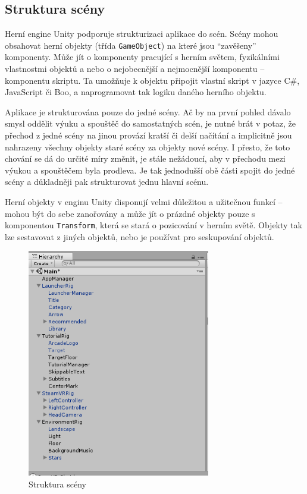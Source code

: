 \subsection{Struktura scény}\label{struktura-scuxe9ny}

Herní engine Unity podporuje strukturizaci aplikace do scén. Scény mohou
obsahovat herní objekty (třída \texttt{GameObject}) na které jsou
``zavěšeny'' komponenty. \autocite{unityscenes} Může jít o komponenty pracující s herním
světem, fyzikálními vlastnostmi objektů a nebo o nejobecnější a
nejmocnější komponentu -- komponentu skriptu. Ta umožňuje k objektu
připojit vlastní skript v jazyce C\#, JavaScript či Boo, a naprogramovat
tak logiku daného herního objektu.

Aplikace je strukturována pouze do jedné scény. Ač by na první pohled
dávalo smysl oddělit výuku a spouštěč do samostatných scén, je nutné
brát v potaz, že přechod z jedné scény na jinou provází kratší či delší
načítání a implicitně jsou nahrazeny všechny objekty staré scény za
objekty nové scény. I přesto, že toto chování se dá do určité míry
změnit, je stále nežádoucí, aby v přechodu mezi výukou a spouštěčem
byla prodleva. Je tak jednodušší obě části spojit do jedné scény a
důkladněji pak strukturovat jednu hlavní scénu.

Herní objekty v enginu Unity disponují velmi důležitou a užitečnou
funkcí -- mohou být do sebe zanořovány a může jít o prázdné objekty
pouze s komponentou \texttt{Transform}, která se stará o pozicování v
herním světě. Objekty tak lze sestavovat z jiných objektů, nebo je
používat pro seskupování objektů.

\newpage

\begin{figure}[h!]
\centering
\includegraphics[height=10cm]{src/assets/structure.png}
\caption{Struktura scény}
\end{figure}


